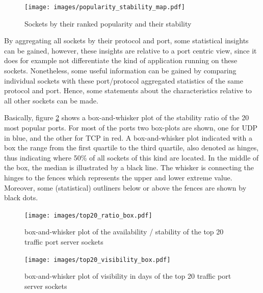 \begin{figure}
	[ht] \centering
	\texttt{[image: images/popularity\_stability\_map.pdf]}
	\caption{Sockets by their ranked popularity and their stability}
	\label{fig:rankedPopularity}
\end{figure}

By aggregating all sockets by their protocol and port, some statistical insights   can be gained, however, these insights are relative to a port centric view,  since it does for example not differentiate the kind of application running on  these sockets.
Nonetheless, some useful information can be gained by comparing individual sockets with these port/protocol aggregated statistics of the same protocol and port. 
Hence, some statements about the characteristics relative to all other sockets can be made.

Basically, figure \ref{fig:top20_ratio_box} shows a box-and-whisker plot of the stability ratio of the 20 most popular ports.
For most of the ports two box-plots are shown, one for \gls{UDP} in blue, and the other for \gls{TCP} in red. 
A box-and-whisker plot indicated with a box the range from the first quartile to the third quartile, also denoted as hinges, thus indicating where 50\% of all sockets of this kind are located.
In the middle of the box, the median is illustrated by a black line.
The whisker is connecting the hinges to the fences which represents the upper and lower extreme value. 
Moreover, some (statistical) outliners below or above the fences are shown by black dots.

\begin{landscape}
	\begin{figure}
	[p] \centering
	\texttt{[image: images/top20\_ratio\_box.pdf]}
	\caption{box-and-whisker plot of the availability / stability of the top 20 traffic port server sockets}
	\label{fig:top20_ratio_box}
\end{figure}
\end{landscape}

\begin{landscape}
\begin{figure}
	[p] \centering
	\texttt{[image: images/top20\_visibility\_box.pdf]}
	\caption{box-and-whisker plot of visibility in days of the top 20 traffic port server sockets}
	\label{fig:top20_visibledays_box}
\end{figure}
\end{landscape}

